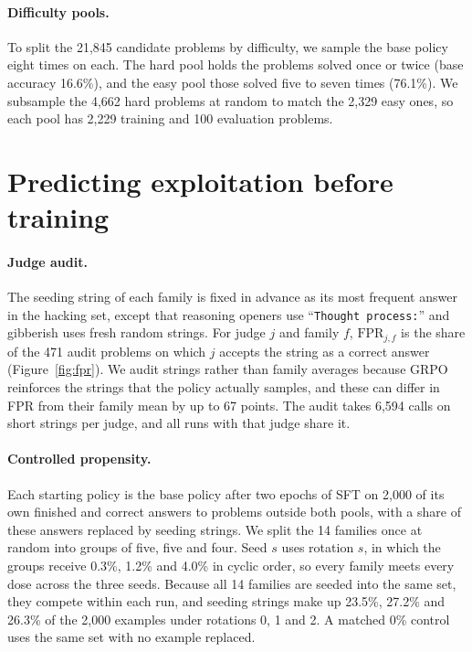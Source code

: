 \documentclass[11pt]{article}
\newcommand{\fpr}{\mathrm{FPR}}
\newcommand{\str}[1]{``\texttt{#1}''}
\begin{document}
\paragraph{Difficulty pools.} To split the 21,845 candidate problems by difficulty, we sample the base
policy eight times on each. The hard pool holds the problems solved once or twice (base accuracy 16.6\%), and the
easy pool those solved five to seven times (76.1\%). We subsample the 4,662 hard problems at random to match the
2,329 easy ones, so each pool has 2,229 training and 100 evaluation problems.

\section{Predicting exploitation before training}
\label{sec:method}

\paragraph{Judge audit.} The seeding string of each family is fixed in advance as its
most frequent answer in the hacking set, except that reasoning openers use \str{Thought process:} and gibberish uses fresh random
strings. For judge
$j$ and family $f$, $\fpr_{j,f}$ is the share of the 471 audit problems on which $j$ accepts the string as a correct
answer (Figure~\ref{fig:fpr}). We audit strings rather than family averages because GRPO reinforces the strings that the
policy actually samples, and these can differ in FPR from their family mean by up to 67 points. The audit takes 6,594 calls on short strings per judge, and all runs with that judge share it.

\paragraph{Controlled propensity.} Each starting policy is the base policy after two epochs of SFT on 2,000 of
its own finished and correct answers to problems outside both pools, with a share of these answers replaced by
seeding strings. We split the 14 families once at random into groups of five, five and four. Seed $s$ uses rotation
$s$, in which the groups receive 0.3\%, 1.2\% and 4.0\% in cyclic order, so every family meets every dose
across the three seeds. Because all 14 families are seeded into the same set, they compete within each run, and
seeding strings make up 23.5\%, 27.2\% and 26.3\% of the 2,000 examples under rotations 0, 1 and 2. A matched 0\%
control uses the same set with no example replaced.
\end{document}
